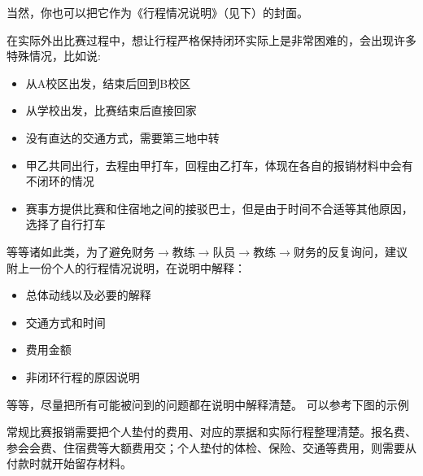 当然，你也可以把它作为《行程情况说明》（见下）的封面。


\Needspace{100mm}

在实际外出比赛过程中，想让行程严格保持闭环实际上是非常困难的，会出现许多特殊情况，比如说:
\begin{itemize}[label=\textcolor{BookPurple}{\textbullet},itemsep=3pt,topsep=4pt]
  \item 从A校区出发，结束后回到B校区
  \item 从学校出发，比赛结束后直接回家
  \item 没有直达的交通方式，需要第三地中转
  \item 甲乙共同出行，去程由甲打车，回程由乙打车，体现在各自的报销材料中会有不闭环的情况
  \item 赛事方提供比赛和住宿地之间的接驳巴士，但是由于时间不合适等其他原因，选择了自行打车
\end{itemize}
等等诸如此类，为了避免财务$\to$教练$\to$队员$\to$教练$\to$财务的反复询问，建议附上一份个人的行程情况说明，在说明中解释：

\begin{itemize}[label=\textcolor{BookPurple}{\textbullet},itemsep=3pt,topsep=4pt]
  \item 总体动线以及必要的解释
  \item 交通方式和时间
  \item 费用金额
  \item 非闭环行程的原因说明
\end{itemize}
等等，尽量把所有可能被问到的问题都在说明中解释清楚。
可以参考下图的示例

\par\noindent\begin{minipage}{\linewidth}
  \begin{minipage}[t]{.48\linewidth}
  \end{minipage}\hfill
  \begin{minipage}[t]{.48\linewidth}
  \end{minipage}
\end{minipage}




常规比赛报销需要把个人垫付的费用、对应的票据和实际行程整理清楚。报名费、参会会费、住宿费等大额费用交；个人垫付的体检、保险、交通等费用，则需要从付款时就开始留存材料。

